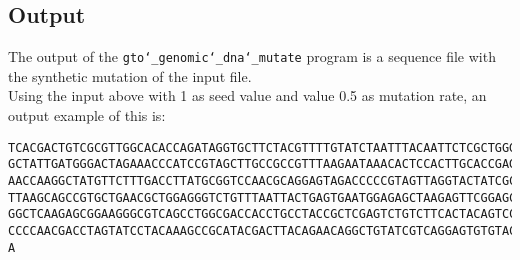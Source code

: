 \subsection*{Output}
The output of the \texttt{gto\char`_genomic\char`_dna\char`_mutate} program is a sequence file with the synthetic mutation of the input file.\\
Using the input above with 1 as seed value and value 0.5 as mutation rate, an output example of this is:
\begin{lstlisting}
TCACGACTGTCGCGTTGGCACACCAGATAGGTGCTTCTACGTTTTGTATCTAATTTACAATTCTCGCTGGGAGTTCATTC
GCTATTGATGGGACTAGAAACCCATCCGTAGCTTGCCGCCGTTTAAGAATAAACACTCCACTTGCACCGAGACGTAGCGC
AACCAAGGCTATGTTCTTTGACCTTATGCGGTCCAACGCAGGAGTAGACCCCCGTAGTTAGGTACTATCGCAGAATAGGC
TTAAGCAGCCGTGCTGAACGCTGGAGGGTCTGTTTAATTACTGAGTGAATGGAGAGCTAAGAGTTCGGAGCACCGCACGA
GGCTCAAGAGCGGAAGGGCGTCAGCCTGGCGACCACCTGCCTACCGCTCGAGTCTGTCTTCACTACAGTCCGTGGAGGAC
CCCCAACGACCTAGTATCCTACAAAGCCGCATACGACTTACAGAACAGGCTGTATCGTCAGGAGTGTGTACACGAAGAGT
A
\end{lstlisting}
